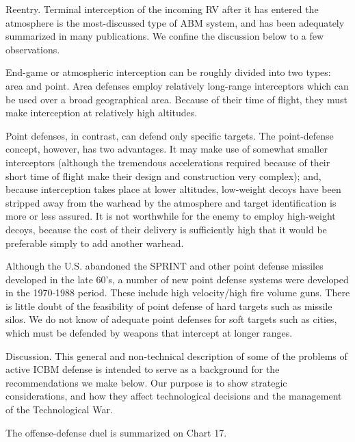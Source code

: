 Reentry. Terminal interception of the incoming RV after it has entered the atmosphere is the most-discussed type of ABM system, and has been adequately summarized in many publications. We confine the discussion below to a few observations.

End-game or atmospheric interception can be roughly divided into two types: area and point. Area defenses employ relatively long-range interceptors which can be used over a broad geographical area. Because of their time of flight, they must make interception at relatively high altitudes.

Point defenses, in contrast, can defend only specific targets. The point-defense concept, however, has two advantages. It may make use of somewhat smaller interceptors (although the tremendous accelerations required because of their short time of flight make their design and construction very complex); and, because interception takes place at lower altitudes, low-weight decoys have been stripped away from the warhead by the atmosphere and target identification is more or less assured. It is not worthwhile for the enemy to employ high-weight decoys, because the cost of their delivery is sufficiently high that it would be preferable simply to add another warhead.

\begin{mdframed}[backgroundcolor=black!10]
Although the U.S. abandoned the SPRINT and other point defense missiles developed in the late 60's, a number of new point defense systems were developed in the 1970-1988 period. These include high velocity/high fire volume guns. There is little doubt of the feasibility of point defense of hard targets such as missile silos. We do not know of adequate point defenses for soft targets such as cities, which must be defended by weapons that intercept at longer ranges.
\end{mdframed}

Discussion. This general and non-technical description of some of the problems of active ICBM defense is intended to serve as a background for the recommendations we make below. Our purpose is to show strategic considerations, and how they affect technological decisions and the management of the Technological War.

The offense-defense duel is summarized on Chart 17.

